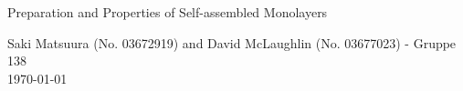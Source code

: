 \documentclass[11pt, a4paper]{article}
\begin{document}
\begin{center}

        {\huge Preparation and Properties of Self-assembled Monolayers}
    \vspace{0.1cm}

      	{Saki Matsuura (No. 03672919) and David McLaughlin (No. 03677023) - Gruppe 138} \\

      	{\today}
    \vspace{-0.2cm}

\end{center}






\end{document}
